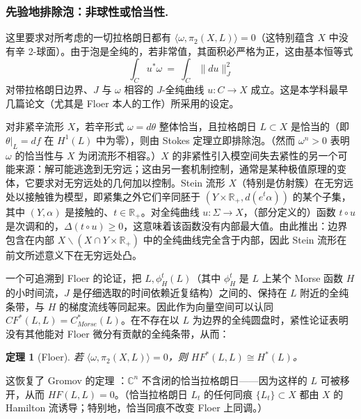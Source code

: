 \documentclass[11pt,a4paper]{article}
\numberwithin{equation}{section}
\newtheorem{Theorem}[thm]{定理}
\newcommand{\bR}{\mathbb{R}}
\newcommand{\bC}{\mathbb{C}}
\begin{document}
\subsubsection{先验地排除泡：非球性或恰当性.\label{Sec:exact}} 这里要求对所考虑的一切拉格朗日都有 $\langle \omega, \pi_2(X,L)\rangle = 0$（这特别蕴含 $X$ 中没有辛 2-球面）。由于泡是全纯的，若非常值，其面积必严格为正，这由基本恒等式
\[
\int_C u^*\omega \ = \ \int_C \| du\|_J^2
\] 
对带拉格朗日边界、$J$ 与 $\omega$ 相容的 $J$-全纯曲线 $u: C \rightarrow X$ 成立。这是本学科最早几篇论文（尤其是 Floer 本人的工作）所采用的设定。

对非紧辛流形 $X$，若辛形式 $\omega = d\theta$ 整体恰当，且拉格朗日 $L\subset X$ 是恰当的（即 $\theta|_L = df$ 在 $H^1(L)$ 中为零），则由 Stokes 定理立即排除泡。（然而 $\omega^n > 0$ 表明 $\omega$ 的恰当性与 $X$ 为闭流形不相容。）$X$ 的非紧性引入模空间失去紧性的另一个可能来源：解可能逃逸到无穷远；这由另一套机制控制，通常是某种极值原理的变体，它要求对无穷远处的几何加以控制。Stein 流形 $X$（特别是仿射簇）在无穷远处以接触锥为模型，即紧集之外它们辛同胚于 $(Y\times \bR_+, d(e^t\alpha))$ 的某个子集，其中 $(Y,\alpha)$ 是接触的、$t\in\bR_+$。对全纯曲线 $u: \Sigma \rightarrow X$，（部分定义的）函数 $t\circ u$ 是次调和的，$\Delta(t\circ u) \geq 0$，这意味着该函数没有内部最大值。由此推出：边界包含在内部 $X \backslash (X \cap Y\times\bR_+)$ 中的全纯曲线完全含于内部，因此 Stein 流形在前文所述意义下在无穷远处凸。

一个可追溯到 Floer 的论证，把 $L, \phi_H^t(L)$（其中 $\phi_H^t$ 是 $L$ 上某个 Morse 函数 $H$ 的小时间流，$J$ 是仔细选取的时间依赖近复结构）之间的、保持在 $L$ 附近的全纯条带，与 $H$ 的梯度流线等同起来。因此作为向量空间可以认同 $CF^*(L,L) = C^*_{Morse}(L)$。在不存在以 $L$ 为边界的全纯圆盘时，紧性论证表明没有其他能对 Floer 微分有贡献的全纯条带，从而：

\begin{Theorem}[Floer] \label{Lem:Floer}
若 $\langle \omega, \pi_2(X,L) \rangle = 0$，则 $HF^*(L,L) \cong H^*(L)$。
\end{Theorem}

这恢复了 Gromov 的定理 \cite{Gromov}：$\bC^n$ 不含闭的恰当拉格朗日——因为这样的 $L$ 可被移开，从而 $HF(L,L)=0$。（恰当拉格朗日 $L_t$ 的任何同痕 $\{L_t\} \subset X$ 都由 $X$ 的 Hamilton 流诱导；特别地，恰当同痕不改变 Floer 上同调。）
\end{document}
